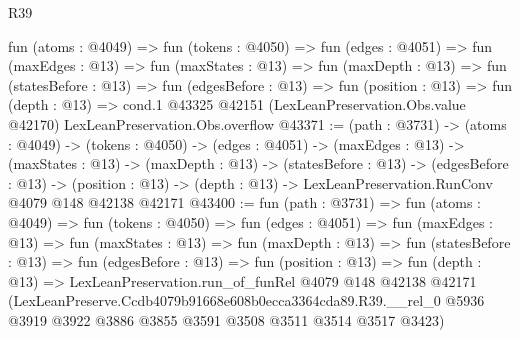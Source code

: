 \begin{lexlean}{R39}
\begin{coremodule}
  fun (atoms : @4049) =>
  fun (tokens : @4050) =>
  fun (edges : @4051) =>
  fun (maxEdges : @13) =>
  fun (maxStates : @13) =>
  fun (maxDepth : @13) =>
  fun (statesBefore : @13) =>
  fun (edgesBefore : @13) =>
  fun (position : @13) =>
  fun (depth : @13) =>
  cond.{1} @43325 @42151 (LexLeanPreservation.Obs.value @42170) LexLeanPreservation.Obs.overflow
@43371 := (path : @3731) ->
  (atoms : @4049) ->
  (tokens : @4050) ->
  (edges : @4051) ->
  (maxEdges : @13) ->
  (maxStates : @13) ->
  (maxDepth : @13) ->
  (statesBefore : @13) ->
  (edgesBefore : @13) ->
  (position : @13) -> (depth : @13) -> LexLeanPreservation.RunConv @4079 @148 @42138 @42171
@43400 := fun (path : @3731) =>
  fun (atoms : @4049) =>
  fun (tokens : @4050) =>
  fun (edges : @4051) =>
  fun (maxEdges : @13) =>
  fun (maxStates : @13) =>
  fun (maxDepth : @13) =>
  fun (statesBefore : @13) =>
  fun (edgesBefore : @13) =>
  fun (position : @13) =>
  fun (depth : @13) =>
  LexLeanPreservation.run_of_funRel
    @4079
    @148
    @42138
    @42171
    (LexLeanPreserve.Ccdb4079b91668e608b0ecca3364cda89.R39.__rel_0
      @5936
      @3919
      @3922
      @3886
      @3855
      @3591
      @3508
      @3511
      @3514
      @3517
      @3423)
\end{coremodule}
\end{lexlean}
